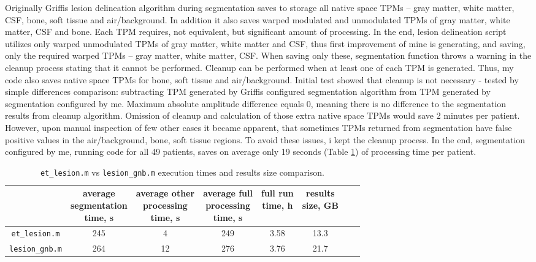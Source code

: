 \documentclass[12pt]{article}
\begin{document}
Originally Griffis lesion delineation algorithm during segmentation saves to storage all native space TPMs – gray matter, white matter, CSF, bone, soft tissue and air/background. In addition it also saves warped modulated and unmodulated TPMs of gray matter, white matter, CSF and bone. Each TPM requires, not equivalent, but significant amount of processing. In the end, lesion delineation script utilizes only warped unmodulated TPMs of gray matter, white matter and CSF, thus first improvement of mine is generating, and saving, only the required warped TPMs – gray matter, white matter, CSF. When saving only these, segmentation function throws a warning in the cleanup process stating that it cannot be performed. Cleanup can be performed when at least one of each TPM is generated. Thus, my code also saves native space TPMs for bone, soft tissue and air/background. Initial test showed that cleanup is not necessary - tested by simple differences comparison: subtracting TPM generated by Griffis configured segmentation algorithm from TPM generated by segmentation configured by me. Maximum absolute amplitude difference equals 0, meaning there is no difference to the segmentation results from cleanup algorithm. Omission of cleanup and calculation of those extra native space TPMs would save 2 minutes per patient. However, upon manual inspection of few other cases it became apparent, that sometimes TPMs returned from segmentation have false positive values in the air/background, bone, soft tissue regions. To avoid these issues, i kept the cleanup process. In the end, segmentation configured by me, running code for all 49 patients, saves on average only 19 seconds (Table \ref{tbl:speeds}) of processing time per patient.

\begin{table}[!h]
\centering
\caption{\texttt{et\_lesion.m} vs \texttt{lesion\_gnb.m} execution times and results size comparison.}
\vspace{1ex}
\begin{tabular}{|c|c|c|c|c|c|c|c|}
\hline
& \shortstack{average \\ segmentation \\ time, s} & \shortstack{average other\\processing\\time, s} & \shortstack{average full\\processing\\time, s} & \shortstack{full run\\time, h} & \shortstack{results\\size, GB} \\ \hline
\texttt{et\_lesion.m} & 245 & 4 & 249 & 3.58 & 13.3 \\ \hline
\texttt{lesion\_gnb.m} & 264 & 12 & 276 & 3.76 & 21.7 \\ \hline
\end{tabular}
\label{tbl:speeds}
\end{table}
\end{document}

